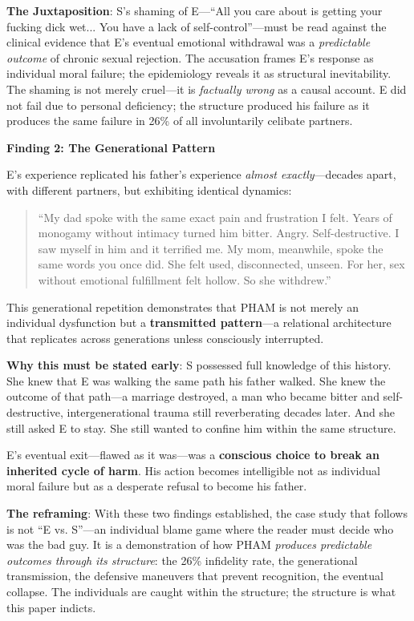 \documentclass[12pt,openany]{book}
\numberwithin{equation}{chapter}
\begin{document}
\textbf{The Juxtaposition}: S's shaming of E---``All you care about is getting your fucking dick wet... You have a lack of self-control''---must be read against the clinical evidence that E's eventual emotional withdrawal was a \textit{predictable outcome} of chronic sexual rejection. The accusation frames E's response as individual moral failure; the epidemiology reveals it as structural inevitability. The shaming is not merely cruel---it is \textit{factually wrong} as a causal account. E did not fail due to personal deficiency; the structure produced his failure as it produces the same failure in 26\% of all involuntarily celibate partners.

\textbf{Finding 2: The Generational Pattern}

E's experience replicated his father's experience \textit{almost exactly}---decades apart, with different partners, but exhibiting identical dynamics:

\begin{quote}
``My dad spoke with the same exact pain and frustration I felt. Years of monogamy without intimacy turned him bitter. Angry. Self-destructive. I saw myself in him and it terrified me. My mom, meanwhile, spoke the same words you once did. She felt used, disconnected, unseen. For her, sex without emotional fulfillment felt hollow. So she withdrew.''
\end{quote}

This generational repetition demonstrates that PHAM is not merely an individual dysfunction but a \textbf{transmitted pattern}---a relational architecture that replicates across generations unless consciously interrupted.

\textbf{Why this must be stated early}: S possessed full knowledge of this history. She knew that E was walking the same path his father walked. She knew the outcome of that path---a marriage destroyed, a man who became bitter and self-destructive, intergenerational trauma still reverberating decades later. And she still asked E to stay. She still wanted to confine him within the same structure.

E's eventual exit---flawed as it was---was a \textbf{conscious choice to break an inherited cycle of harm}. His action becomes intelligible not as individual moral failure but as a desperate refusal to become his father.

\textbf{The reframing}: With these two findings established, the case study that follows is not ``E vs. S''---an individual blame game where the reader must decide who was the bad guy. It is a demonstration of how PHAM \textit{produces predictable outcomes through its structure}: the 26\% infidelity rate, the generational transmission, the defensive maneuvers that prevent recognition, the eventual collapse. The individuals are caught within the structure; the structure is what this paper indicts.
\end{document}
